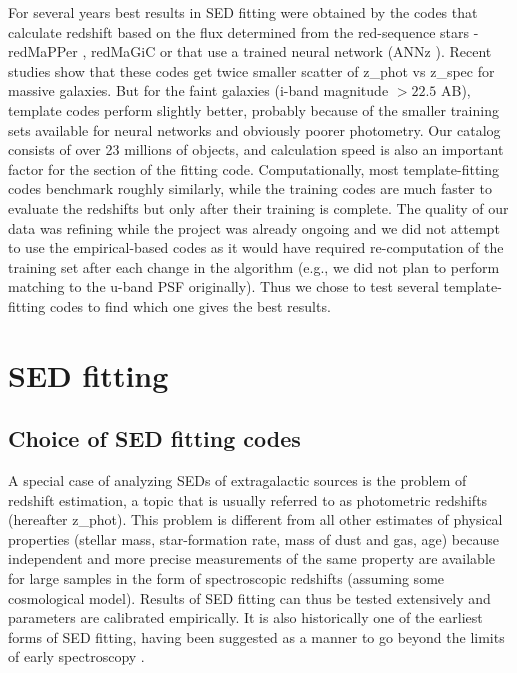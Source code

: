 For several years best results in SED fitting were obtained by the codes that calculate redshift based on the flux determined from the red-sequence stars - redMaPPer \citep{2014ApJ...785..104R}, redMaGiC \citep{2015MNRAS.453...38R} or that use a trained neural network (ANNz \citep{2004PASP..116..345C}). Recent studies \citep{Bundy2015} show that these codes get twice smaller scatter of z\_phot vs z\_spec for massive galaxies. But for the faint galaxies (i-band magnitude $> 22.5$ AB), template codes perform slightly better, probably because of the smaller training sets available for neural networks and obviously poorer photometry. Our catalog consists of over 23 millions of objects, and calculation speed is also an important factor for the section of the fitting code. Computationally, most template-fitting codes benchmark roughly similarly, while the training codes are much faster to evaluate the redshifts but only after their training is complete. The quality of our data was refining while the project was already ongoing and we did not attempt to use the empirical-based codes as it would have required re-computation of the training set after each change in the algorithm (e.g., we did not plan to perform matching to the u-band PSF originally). Thus we chose to test several template-fitting codes to find which one gives the best results.

\section{SED fitting}

\subsection{Choice of SED fitting codes}

A special case of analyzing SEDs of extragalactic sources
is the problem of redshift estimation, a topic that is usually
referred to as photometric redshifts (hereafter z\_phot). This
problem is different from all other estimates of physical properties (stellar mass, star-formation rate, mass of dust and gas, age) because independent and more precise measurements of the same property are available for large samples in the
form of spectroscopic redshifts (assuming some cosmological model). Results of SED fitting can thus be
tested extensively and parameters are calibrated empirically. It is also
historically one of the earliest forms of SED fitting, having been suggested as a manner to go beyond the limits of early spectroscopy \citep{1957AJ.....62....6B}.

